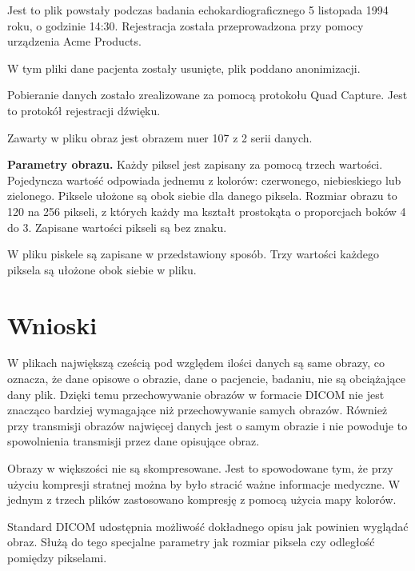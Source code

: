 \documentclass[11pt,a4paper]{article}
\begin{document}
Jest to plik powstały podczas badania echokardiograficznego 5 listopada 1994 roku, o godzinie 14:30. Rejestracja została przeprowadzona przy pomocy urządzenia Acme Products.

W tym pliki dane pacjenta zostały usunięte, plik poddano anonimizacji.

Pobieranie danych zostało zrealizowane za pomocą protokołu Quad Capture. Jest to protokół rejestracji dźwięku.

Zawarty w pliku obraz jest obrazem nuer 107 z 2 serii danych.

\textbf{Parametry obrazu.} Każdy piksel jest zapisany za pomocą trzech wartości. Pojedyncza wartość odpowiada jednemu z kolorów: czerwonego, niebieskiego lub zielonego. Piksele ułożone są obok siebie dla danego piksela. Rozmiar obrazu to 120 na 256 pikseli, z których każdy ma kształt prostokąta o proporcjach boków 4 do 3. Zapisane wartości pikseli są bez znaku.

W pliku piskele są zapisane w przedstawiony sposób. Trzy wartości każdego piksela są ułożone obok siebie w pliku.

\section{Wnioski}
W plikach największą cześcią pod względem ilości danych są same obrazy, co oznacza, że dane opisowe o obrazie, dane o pacjencie, badaniu, nie są obciążające dany plik. Dzięki temu przechowywanie obrazów w formacie DICOM nie jest znacząco bardziej wymagające niż przechowywanie samych obrazów. Również przy transmisji obrazów najwięcej danych jest o samym obrazie i nie powoduje to spowolnienia transmisji przez dane opisujące obraz.

Obrazy w większości nie są skompresowane. Jest to spowodowane tym, że przy użyciu kompresji stratnej można by było stracić ważne informacje medyczne. W jednym z trzech plików zastosowano kompresję z pomocą użycia mapy kolorów.

Standard DICOM udostępnia możliwość dokładnego opisu jak powinien wyglądać obraz. Służą do tego specjalne parametry jak rozmiar piksela czy odległość pomiędzy pikselami.
\end{document}
